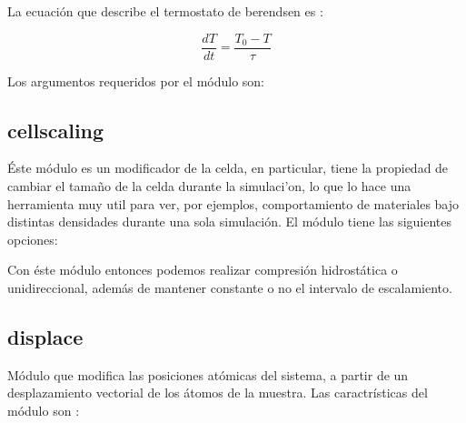 La ecuaci\'on que describe el termostato de berendsen es :

$$\frac{dT}{dt} = \frac{T_0 - T}{\tau}$$

Los argumentos requeridos por el m\'odulo son:


\subsection{cellscaling}
\'Este m\'odulo es un modificador de la celda, en particular, tiene la propiedad de cambiar el tama\~no de la celda durante la simulaci'on, lo que lo hace una herramienta muy util para ver, por ejemplos, comportamiento de materiales bajo distintas densidades durante una sola simulaci\'on. El m\'odulo tiene las siguientes opciones:


Con \'este m\'odulo entonces podemos realizar compresi\'on hidrost\'atica o unidireccional, adem\'as de mantener constante o no el intervalo de escalamiento.

\subsection{displace}
M\'odulo que modifica las posiciones at\'omicas del sistema, a partir de un desplazamiento vectorial de los \'atomos de la muestra. Las caractr\'isticas del m\'odulo son :


